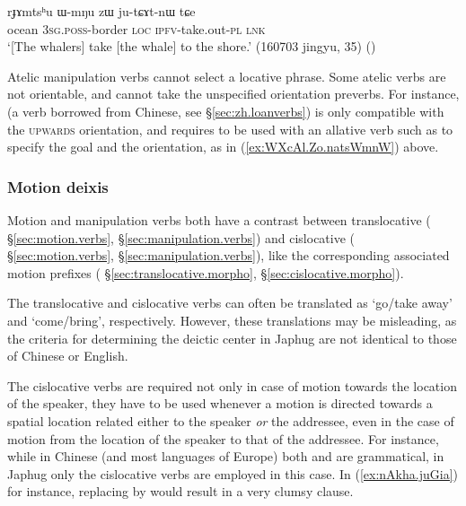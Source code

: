 \begin{exe}
\ex \label{ex:WmNu.zW.jutCAtnW}
\gll   rɟɤmtsʰu ɯ-mŋu zɯ ju-tɕɤt-nɯ tɕe \\
ocean \textsc{3sg}.\textsc{poss}-border \textsc{loc} \textsc{ipfv}-take.out-\textsc{pl} \textsc{lnk} \\
\glt `[The whalers] take [the whale] to the shore.' (160703 jingyu, 35)
()
\end{exe}

Atelic manipulation verbs cannot select a locative phrase. Some atelic verbs are not orientable, and cannot take the unspecified orientation preverbs. For instance,  (a verb borrowed from Chinese, see §\ref{sec:zh.loanverbs}) is only compatible with the \textsc{upwards} orientation, and requires to be used with an allative verb such as  to specify the goal and the orientation, as in (\ref{ex:WXcAl.Zo.natsWmnW}) above.


\subsubsection{Motion deixis} \label{sec:motion.deixis}
Motion and manipulation verbs both have a contrast between translocative ( §\ref{sec:motion.verbs},  §\ref{sec:manipulation.verbs}) and cislocative ( §\ref{sec:motion.verbs},  §\ref{sec:manipulation.verbs}), like the corresponding associated motion prefixes ( §\ref{sec:translocative.morpho},  §\ref{sec:cislocative.morpho}).

The translocative and cislocative verbs can often be translated as `go/take away' and `come/bring', respectively. However, these translations may be misleading, as the criteria for determining the deictic center in Japhug are not identical to those of Chinese or English.

The cislocative verbs are required not only in case of motion towards the location of the speaker, they have to be used whenever a motion is directed towards a spatial location related either to the speaker \textit{or} the addressee, even in the case of motion from the location of the speaker to that of the addressee. For instance, while in Chinese (and most languages of Europe) both  and  are  grammatical, in Japhug only the cislocative verbs are employed in this case. In (\ref{ex:nAkha.juGia}) for instance, replacing  by  would result in a very clumsy clause.

